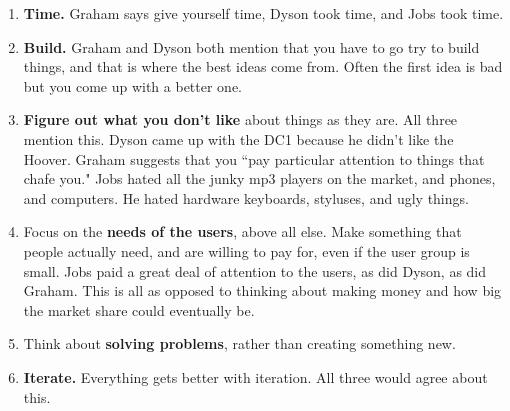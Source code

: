 \documentclass[11pt, oneside]{article}   	%
\begin{document}
\begin{enumerate}
\item \textbf{Time.}  Graham says give yourself time, Dyson took time, and Jobs took time.
\item \textbf{Build.}  Graham and Dyson both mention that you have to go try to build things, and that is where the best ideas come from.  Often the first idea is bad but you come up with a better one.
\item \textbf{Figure out what you don't like} about things as they are.  All three mention this.  Dyson came up with the DC1 because he didn't like the Hoover.  Graham suggests that you ``pay particular attention to things that chafe you."  Jobs hated all the junky mp3 players on the market, and phones, and computers.  He hated hardware keyboards, styluses, and ugly things.
\item Focus on the \textbf{needs of the users}, above all else.  Make something that people actually need, and are willing to pay for, even if the user group is small.  Jobs paid a great deal of attention to the users, as did Dyson, as did Graham.  This is all as opposed to thinking about making money and how big the market share could eventually be.
\item Think about \textbf{solving problems}, rather than creating something new.  
\item \textbf{Iterate.}  Everything gets better with iteration.  All three would agree about this.

\end{enumerate}
\end{document}
